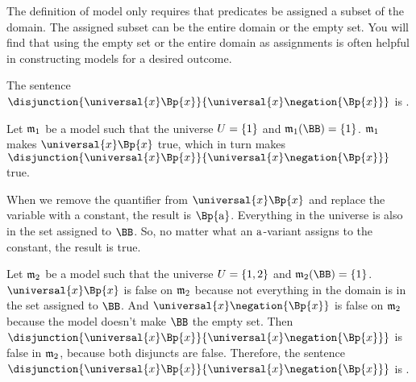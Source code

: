 The definition of model only requires that predicates be assigned a subset of the domain.
The assigned subset can be the entire domain or the empty set.
You will find that using the empty set or the entire domain as assignments is often helpful in constructing models for a desired outcome.

\begin{majorILnc}{}
	The sentence $\disjunction{\universal{\variable{x}}\Bp{\variable{x}}}{\universal{\variable{x}}\negation{\Bp{\variable{x}}}}$ is .
\end{majorILnc}
\begin{PROOF}
Let $\mathfrak{m}_1$ be a model such that the universe $U=\{1\}$ and $\IntA_1(\BB)=\{1\}$. 
$\mathfrak{m}_1$ makes $\universal{\variable{x}}\Bp{\variable{x}}$ true, which in turn makes $\disjunction{\universal{\variable{x}}\Bp{\variable{x}}}{\universal{\variable{x}}\negation{\Bp{\variable{x}}}}$ true.
\begin{commentary}
	When we remove the quantifier from $\universal{\variable{x}}\Bp{\variable{x}}$ and replace the variable with a constant, the result is $\Bp{\constant{a}}$.
	Everything in the universe is also in the set assigned to $\BB$.
	So, no matter what an $\mathrm{a}$-variant assigns to the constant, the result is true.
\end{commentary}
\noindent{}Let $\mathfrak{m}_2$ be a model such that the universe $U=\{1,2\}$ and $\IntA_2(\BB)=\{1\}$.
$\universal{\variable{x}}\Bp{\variable{x}}$ is false on $\mathfrak{m}_2$ because not everything in the domain is in the set assigned to $\BB$.
And $\universal{\variable{x}}\negation{\Bp{\variable{x}}}$ is false on $\mathfrak{m}_2$ because the model doesn't make $\BB$ the empty set.
Then $\disjunction{\universal{\variable{x}}\Bp{\variable{x}}}{\universal{\variable{x}}\negation{\Bp{\variable{x}}}}$ is false in $\mathfrak{m}_2$, because both disjuncts are false.  
Therefore, the sentence $\disjunction{\universal{\variable{x}}\Bp{\variable{x}}}{\universal{\variable{x}}\negation{\Bp{\variable{x}}}}$ is .
\end{PROOF}

